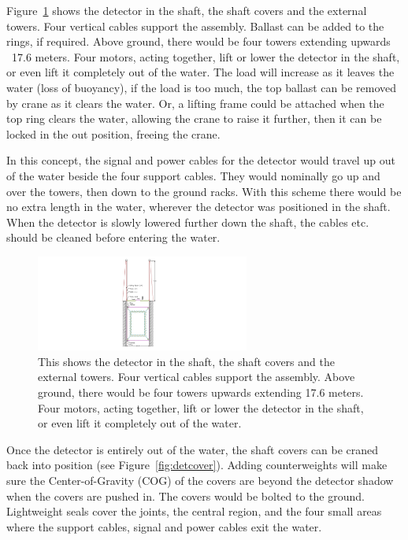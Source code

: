 Figure~\ref{fig:dettower} shows the detector in the shaft, the shaft covers
 and the external towers. Four vertical cables support the assembly. Ballast can be
 added to the rings, if required. Above ground, there would be four towers extending
 upwards ~17.6 meters. Four motors, acting together, lift or lower the detector in
 the shaft, or even lift it completely out of the water. The load will increase as
 it leaves the water (loss of buoyancy), if the load is too much, the top ballast
 can be removed by crane as it clears the water. Or, a lifting frame could be attached
 when the top ring clears the water, allowing the crane to raise it further, then it can
 be locked in the out position, freeing the crane.

In this concept, the signal and
 power cables for the detector would travel up out of the water beside the four support cables.
 They would nominally go up and over the towers, then down to the ground racks. With this
 scheme there would be no extra length in the water, wherever the detector was positioned
 in the shaft. When the detector is slowly lowered further down the shaft, the cables etc.
 should be cleaned before entering the water.


\begin{figure}[htpb]
\centering\includegraphics[bb=750 0 1050 850,clip,width=7cm]{figures/fig3-3.jpg}
\caption{This shows the detector in the shaft, the shaft covers and the external towers.
 Four vertical cables support the assembly. Above ground, there would be four towers upwards
 extending 17.6 meters. Four motors, acting together, lift or lower the detector in the shaft,
 or even lift it completely out of the water.}
\label{fig:dettower}
\end{figure}

Once the detector is entirely out of the water, the shaft covers can be craned back into
 position (see Figure~\ref{fig:detcover}). Adding counterweights will 
make sure the Center-of-Gravity (COG)
 of the covers are beyond the detector shadow when the covers are pushed in. 
The covers would be bolted to the ground.
 Lightweight seals cover the joints, the central region, and the four small areas where the support
 cables, signal and power cables exit the water.


